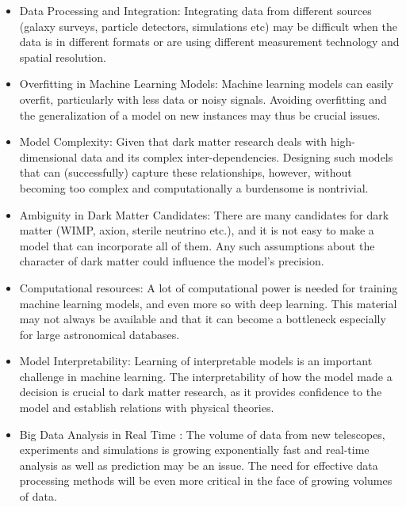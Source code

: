 \begin{itemize}
    \item Data Processing and Integration: Integrating data from different sources (galaxy surveys, particle detectors, simulations etc) may be difficult when the data is in different formats or are using different measurement technology and spatial resolution.
    
    \item Overfitting in Machine Learning Models: Machine learning models can easily overfit, particularly with less data or noisy signals. Avoiding overfitting and the generalization of a model on new instances may thus be crucial issues.

    \item Model Complexity: Given that dark matter research deals with high-dimensional data and its complex inter-dependencies. Designing such models that can (successfully) capture these relationships, however, without becoming too complex and computationally a burdensome is nontrivial.

    \item Ambiguity in Dark Matter Candidates: There are many candidates for dark matter (WIMP, axion, sterile neutrino etc.), and it is not easy to make a model that can incorporate all of them. Any such assumptions about the character of dark matter could influence the model’s precision.

    \item Computational resources: A lot of computational power is needed for training machine learning models, and even more so with deep learning. This material may not always be available and that it can become a bottleneck especially for large astronomical databases.

    \item Model Interpretability: Learning of interpretable models is an important challenge in machine learning. The interpretability of how the model made a decision is crucial to dark matter research, as it provides confidence to the model and establish relations with physical theories.

    \item Big Data Analysis in Real Time : The volume of data from new telescopes, experiments and simulations is growing exponentially fast and real-time analysis as well as prediction may be an issue. The need for effective data processing methods will be even more critical in the face of growing volumes of data.

\end{itemize}
 

